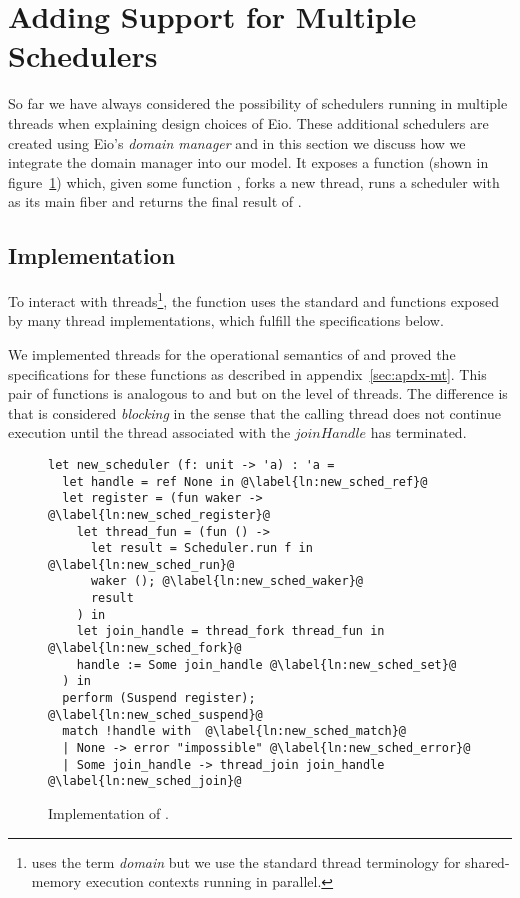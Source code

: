 \section{Adding Support for Multiple Schedulers}
\label{sec:domain-manager}

So far we have always considered the possibility of schedulers running in multiple threads when explaining design choices of Eio.
These additional schedulers are created using Eio's \emph{domain manager} and in this section we discuss how we integrate the domain manager into our model.
It exposes a function  (shown in figure~\ref{fig:dm-impl}) which, given some function , forks a new thread, runs a scheduler with  as its main fiber and returns the final result of .

\subsection{Implementation}
To interact with threads\footnote{\ocf{} uses the term \emph{domain} but we use the standard thread terminology for shared-memory execution contexts running in parallel.},
the function uses the standard  and  functions exposed by many thread implementations, which fulfill the specifications below.
%
We implemented threads for the operational semantics of \hazel{} and proved the specifications for these functions as described in appendix~\ref{sec:apdx-mt}.
This pair of functions is analogous to  and  but on the level of threads.
The difference is that  is considered \emph{blocking} in the sense that the calling thread does not continue execution until the thread associated with the \(joinHandle\) has terminated.

\begin{figure}[ht]
  \begin{verbatim}
let new_scheduler (f: unit -> 'a) : 'a = 
  let handle = ref None in @\label{ln:new_sched_ref}@
  let register = (fun waker -> @\label{ln:new_sched_register}@ 
    let thread_fun = (fun () ->
      let result = Scheduler.run f in @\label{ln:new_sched_run}@ 
      waker (); @\label{ln:new_sched_waker}@
      result
    ) in
    let join_handle = thread_fork thread_fun in @\label{ln:new_sched_fork}@
    handle := Some join_handle @\label{ln:new_sched_set}@
  ) in
  perform (Suspend register); @\label{ln:new_sched_suspend}@
  match !handle with  @\label{ln:new_sched_match}@
  | None -> error "impossible" @\label{ln:new_sched_error}@
  | Some join_handle -> thread_join join_handle @\label{ln:new_sched_join}@
\end{verbatim}
  \caption{Implementation of .}
  \label{fig:dm-impl}
\end{figure}

